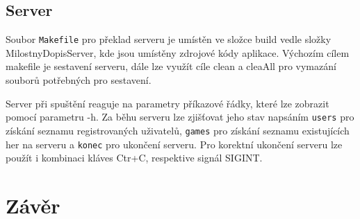 \documentclass[12pt, a4paper]{article}
\begin{document}
\subsection{Server}

Soubor \texttt{Makefile} pro překlad serveru je umístěn ve složce build vedle složky MilostnyDopisServer, kde jsou umístěny zdrojové kódy aplikace. Výchozím cílem makefile je sestavení serveru, dále lze využít cíle clean a cleaAll pro vymazání souborů potřebných pro sestavení.

Server při spuštění reaguje na parametry příkazové řádky, které lze zobrazit pomocí parametru -h. Za běhu serveru lze zjišťovat jeho stav napsáním \texttt{users} pro získání seznamu registrovaných uživatelů, \texttt{games} pro získání seznamu existujících her na serveru a \texttt{konec} pro ukončení serveru. Pro korektní ukončení serveru lze použít i kombinaci kláves Ctr+C, respektive signál SIGINT. 

\newpage
\section{Závěr}  %
\end{document}
